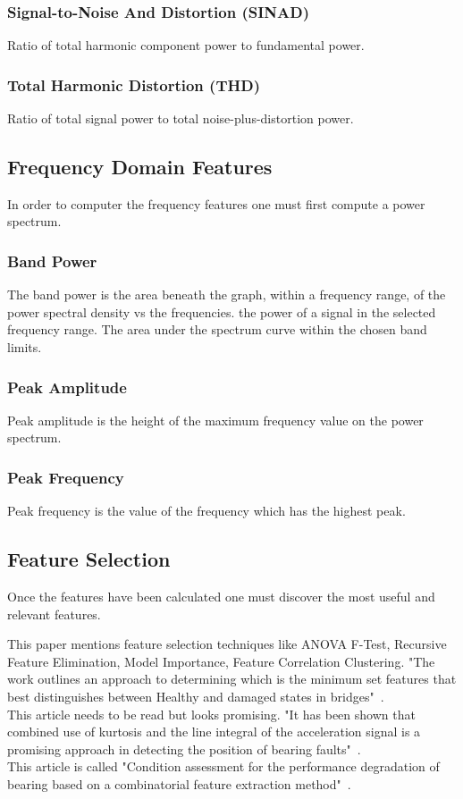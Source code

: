 \documentclass[]{article}
\begin{document}
\subsubsection*{Signal-to-Noise And Distortion (\gls{SINAD})}
Ratio of total harmonic component power to fundamental power.
\subsubsection*{Total Harmonic Distortion (\gls{THD})}
Ratio of total signal power to total noise-plus-distortion power.

\subsection{Frequency Domain Features}
In order to computer the frequency features one must first compute a power spectrum.
\subsubsection*{Band Power}
The band power is the area beneath the graph, within a frequency range, of the power spectral density vs the frequencies.
the power of a signal in the selected frequency range.
The area under the spectrum curve within the chosen band limits.
\subsubsection*{Peak Amplitude}
Peak amplitude is the height of the maximum frequency value on the power spectrum.
\subsubsection*{Peak Frequency}
Peak frequency is the value of the frequency which has the highest peak.

\subsection{Feature Selection}
Once the features have been calculated one must discover the most useful and relevant features. 

This paper mentions feature selection techniques like ANOVA F-Test, Recursive Feature Elimination, Model Importance, Feature Correlation Clustering. "The work outlines an approach to determining which is the minimum set features that best distinguishes between Healthy and damaged states in bridges"~\cite{buckley2023feature}.\\
This article needs to be read but looks promising. "It has been shown that combined use of kurtosis and the line integral of the acceleration signal is a promising approach in detecting the position of bearing faults"~\cite{kateris2014machine}.\\
This article is called "Condition assessment for the performance degradation of bearing based on a combinatorial feature extraction method"~\cite{hong2014condition}.
\end{document}
